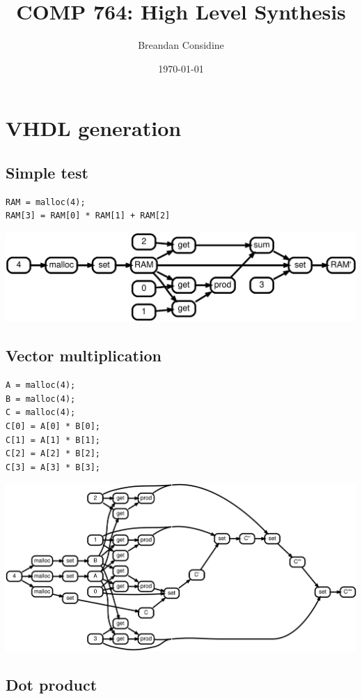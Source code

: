 \documentclass[11pt]{article}
\title{COMP 764: High Level Synthesis}
\date{\today}
\author{Breandan Considine}
\begin{document}
    \maketitle

\section{VHDL generation}
\subsection{Simple test}

\begin{lstlisting}
RAM = malloc(4);
RAM[3] = RAM[0] * RAM[1] + RAM[2]
\end{lstlisting}

\includegraphics[scale=0.25]{rtd31}

\pagebreak\subsection{Vector multiplication}

\begin{lstlisting}
A = malloc(4);
B = malloc(4);
C = malloc(4);
C[0] = A[0] * B[0];
C[1] = A[1] * B[1];
C[2] = A[2] * B[2];
C[3] = A[3] * B[3];
\end{lstlisting}

\includegraphics[scale=0.25]{rtd32}

\pagebreak\subsection{Dot product}
\end{document}
